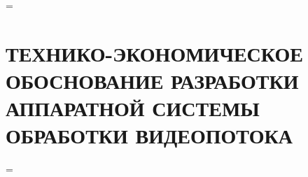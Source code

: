 \newdimen\origiwstr
\origiwstr=\font
{}\origiwstr
\section{ТЕХНИКО-ЭКОНОМИЧЕСКОЕ ОБОСНОВАНИЕ РАЗРАБОТКИ АППАРАТНОЙ СИСТЕМЫ ОБРАБОТКИ ВИДЕОПОТОКА}
\font=\origiwstr
\label{sec:economics}
















